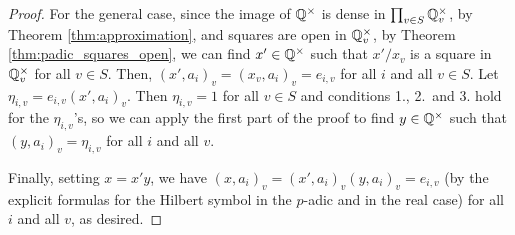 \begin{proof}
For the general case, since the image of $\mathbb{Q}^\times$ is dense in $\prod_{v \in S} \mathbb{Q}_v^\times$, by
Theorem \ref{thm:approximation}, and squares are open in $\mathbb{Q}_v^\times$, by Theorem \ref{thm:padic_squares_open},
we can find $x' \in \mathbb{Q}^\times$ such that $x'/x_v$ is a square in $\mathbb{Q}_v^\times$ for all $v \in S$.
Then, $(x', a_i)_v = (x_v, a_i)_v = e_{i,v}$ for all $i$ and all $v \in S$.
Let $\eta_{i,v}= e_{i,v} (x', a_i)_v$. Then $\eta_{i,v}=1$ for all $v \in S$ and conditions 1., 2.\
and 3. hold for the $\eta_{i,v}$'s, so we can apply the first part of the proof to find $y \in \mathbb{Q}^\times$
such that $(y, a_i)_v = \eta_{i,v}$ for all $i$ and all $v$.

Finally, setting $x = x' y$, we have $(x, a_i)_v = (x', a_i)_v (y, a_i)_v = e_{i,v}$ (by the explicit
formulas for the Hilbert symbol in the $p$-adic and in the real case) for all $i$ and all $v$, as desired.
\end{proof}
